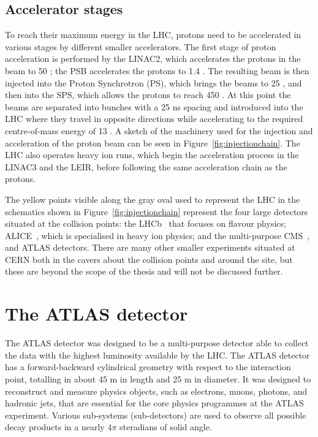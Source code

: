 	\subsection*{Accelerator stages}
	To reach their maximum energy in the \ac{LHC}, protons need to be accelerated in various stages by different smaller accelerators. 
	The first stage of proton acceleration is performed by the \ac{LINAC2}, which accelerates the protons in the beam to 50 \mev; 
	the \ac{PSB} accelerates the protons to 1.4 \gev. 
	The resulting beam is then injected into the Proton Synchrotron (PS), which brings the beams to 25 \gev, and then into the \ac{SPS}, which allows the protons to reach 450 \gev.
	At this point the beams are separated into bunches with a 25 ns spacing and introduced into the \ac{LHC} where they travel in opposite directions while accelerating to the required centre-of-mass energy of 13 \tev.
	A sketch of the machinery used for the injection and acceleration of the proton beam can be seen in Figure~\ref{fig:injectionchain}. 
	The \ac{LHC} also operates heavy ion runs, which begin the acceleration process in the \ac{LINAC3} and the \ac{LEIR}, before following the same acceleration chain as the protons.
	\injectionChain
	
	The yellow points visible along the gray oval used to represent the \ac{LHC} in the schematics shown in Figure~\ref{fig:injectionchain} represent the four large detectors situated at the collision points: the \ac{LHCb}~\cite{LHCb2008} that focuses on flavour physics; \ac{ALICE}~\cite{ALICEJINST}, which is specialised in heavy ion physics; and the multi-purpose \ac{CMS}~\cite{CMSJINST}, and \ac{ATLAS} detectors. There are many other smaller experiments situated at \ac{CERN} both in the cavers about the collision points and around the site, but these are beyond the scope of the thesis and will not be discussed further. 
	
	\section{The ATLAS detector}
	\label{sec:detector}
	The \ac{ATLAS} detector was designed to be a multi-purpose detector able to collect the data with the highest luminosity available by the \ac{LHC}. The \ac{ATLAS} detector has a forward-backward cylindrical geometry with respect to the interaction point, totalling in about 45 m in length and 25 m in diameter.  It was designed to reconstruct and measure physics objects, such as electrons, muons, photons, and hadronic jets, that are essential for the core physics programmes at the \ac{ATLAS} experiment.
	Various sub-systems (sub-detectors) are used to observe all possible decay products in a nearly $4\pi$ steradians of solid angle. 
	
